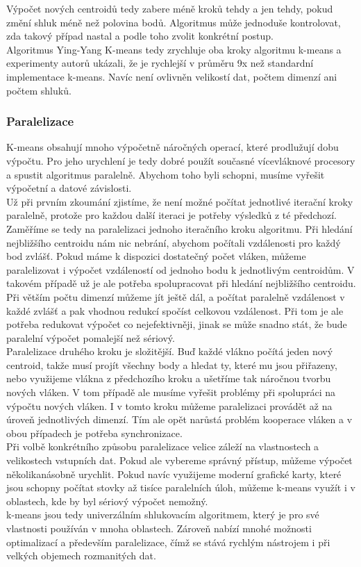 Výpočet nových centroidů tedy zabere méně kroků tehdy a jen tehdy, pokud změní shluk méně než polovina bodů. Algoritmus může jednoduše kontrolovat, zda takový případ nastal a podle toho zvolit konkrétní postup.\\

Algoritmus Ying-Yang K-means tedy zrychluje oba kroky algoritmu k-means a experimenty autorů ukázali, že je rychlejší v průměru 9x než standardní implementace k-means. Navíc není ovlivněn velikostí dat, počtem dimenzí ani počtem shluků.

\subsubsection{Paralelizace}
K-means obsahují mnoho výpočetně náročných operací, které prodlužují dobu výpočtu. Pro jeho urychlení je tedy dobré použít současné vícevláknové procesory a spustit algoritmus paralelně. Abychom toho byli schopni, musíme vyřešit výpočetní a datové závislosti.\\

Už při prvním zkoumání zjistíme, že není možné počítat jednotlivé iterační kroky paralelně, protože pro každou další iteraci je potřeby výsledků z té předchozí. Zaměříme se tedy na paralelizaci jednoho iteračního kroku algoritmu. Při hledání nejbližšího centroidu nám nic nebrání, abychom počítali vzdálenosti pro každý bod zvlášť. Pokud máme k dispozici dostatečný počet vláken, můžeme paralelizovat i výpočet vzdáleností od jednoho bodu k jednotlivým centroidům. V takovém případě už je ale potřeba spolupracovat při hledání nejbližšího centroidu. Při větším počtu dimenzí můžeme jít ještě dál, a počítat paralelně vzdálenost v každé zvlášť a pak vhodnou redukcí spočíst celkovou vzdálenost. Při tom je ale potřeba redukovat výpočet co nejefektivněji, jinak se může snadno stát, že bude paralelní výpočet pomalejší než sériový.\\

Paralelizace druhého kroku je složitější. Buď každé vlákno počítá jeden nový centroid, takže musí projít všechny body a hledat ty, které mu jsou přiřazeny, nebo využijeme vlákna z předchozího kroku a ušetříme tak náročnou tvorbu nových vláken. V tom případě ale musíme vyřešit problémy při spolupráci na výpočtu nových vláken. I v tomto kroku můžeme paralelizaci provádět až na úroveň jednotlivých dimenzí. Tím ale opět narůstá problém kooperace vláken a v obou případech je potřeba synchronizace.\\

Při volbě konkrétního způsobu paralelizace velice záleží na vlastnostech a velikostech vstupních dat. Pokud ale vybereme správný přístup, můžeme výpočet několikanásobně urychlit. Pokud navíc využijeme moderní grafické karty, které jsou schopny počítat stovky až tisíce paralelních úloh, můžeme k-means využít i v oblastech, kde by byl sériový výpočet nemožný.\\

k-means jsou tedy univerzálním shlukovacím algoritmem, který je pro své vlastnosti používán v mnoha oblastech. Zároveň nabízí mnohé možnosti optimalizací a především paralelizace, čímž se stává rychlým nástrojem i při velkých objemech rozmanitých dat.